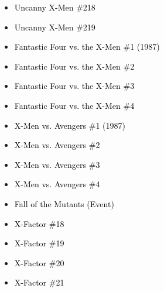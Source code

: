 \documentclass[12pt]{article}
\newcommand{\checkbox}{\raisebox{0.0ex}{\fbox{\rule{0ex}{1.5ex} \rule{1.5ex}{0ex}}}}
\begin{document}
\vspace{0.3cm}
\noindent
\begin{tcolorbox}[
  colback=white!95!gray,
  colframe=black,
  width=\textwidth,
  arc=4mm,
  auto outer arc,
  boxrule=0.8pt,
  left=8pt,right=8pt,top=8pt,bottom=8pt
]
\begin{itemize}[left=0pt,label={\checkbox}]
  \item \textcolor{black}{Uncanny X-Men \#218}
  \item \textcolor{black}{Uncanny X-Men \#219}
  \item \textcolor{black}{Fantastic Four vs. the X-Men \#1 (1987)}
  \item \textcolor{black}{Fantastic Four vs. the X-Men \#2}
  \item \textcolor{black}{Fantastic Four vs. the X-Men \#3}
  \item \textcolor{black}{Fantastic Four vs. the X-Men \#4}
  \item \textcolor{black}{X-Men vs. Avengers \#1 (1987)}
  \item \textcolor{black}{X-Men vs. Avengers \#2}
  \item \textcolor{black}{X-Men vs. Avengers \#3}
  \item \textcolor{black}{X-Men vs. Avengers \#4}
  \item \textcolor{black}{Fall of the Mutants (Event)}
  \item \textcolor{black}{X-Factor \#18}
  \item \textcolor{black}{X-Factor \#19}
  \item \textcolor{black}{X-Factor \#20}
  \item \textcolor{black}{X-Factor \#21}
\end{itemize}
\end{tcolorbox}

\newpage
{}
\end{document}
